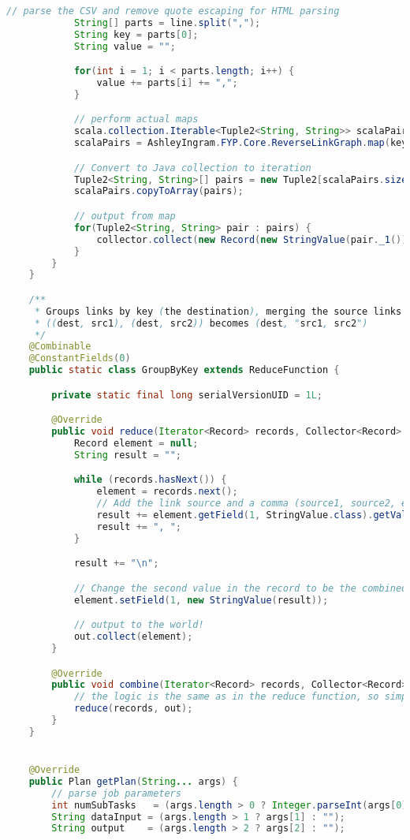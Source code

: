 \begin{lstlisting}[language=java]
			// parse the CSV and remove quote escaping for HTML parsing
			String[] parts = line.split(",");
			String key = parts[0];
			String value = "";

			for(int i = 1; i < parts.length; i++) {
			    value += parts[i] += ",";
			}

			// perform actual maps
			scala.collection.Iterable<Tuple2<String, String>> scalaPairs;
			scalaPairs = AshleyIngram.FYP.Core.ReverseLinkGraph.map(key, value);

			// Convert to Java collection to iteration
			Tuple2<String, String>[] pairs = new Tuple2[scalaPairs.size()];
			scalaPairs.copyToArray(pairs);

			// output from map
			for(Tuple2<String, String> pair : pairs) {
				collector.collect(new Record(new StringValue(pair._1()), new StringValue(pair._2())));
			}
		}
	}

	/**
	 * Groups links by key (the destination), merging the source links into a string so
	 * ((dest, src1), (dest, src2)) becomes (dest, "src1, src2")
	 */
	@Combinable
	@ConstantFields(0)
	public static class GroupByKey extends ReduceFunction {

		private static final long serialVersionUID = 1L;

		@Override
		public void reduce(Iterator<Record> records, Collector<Record> out) throws Exception {
			Record element = null;
			String result = "";

			while (records.hasNext()) {
				element = records.next();
				// Add the link source and a comma (source1, source2, etc)
				result += element.getField(1, StringValue.class).getValue();
				result += ", ";
			}

			result += "\n";

			// Change the second value in the record to be the combined string
			element.setField(1, new StringValue(result));

			// output to the world!
			out.collect(element);
		}

		@Override
		public void combine(Iterator<Record> records, Collector<Record> out) throws Exception {
			// the logic is the same as in the reduce function, so simply call the reduce method
			reduce(records, out);
		}
	}


	@Override
	public Plan getPlan(String... args) {
		// parse job parameters
		int numSubTasks   = (args.length > 0 ? Integer.parseInt(args[0]) : 1);
		String dataInput = (args.length > 1 ? args[1] : "");
		String output    = (args.length > 2 ? args[2] : "");


\end{lstlisting}
